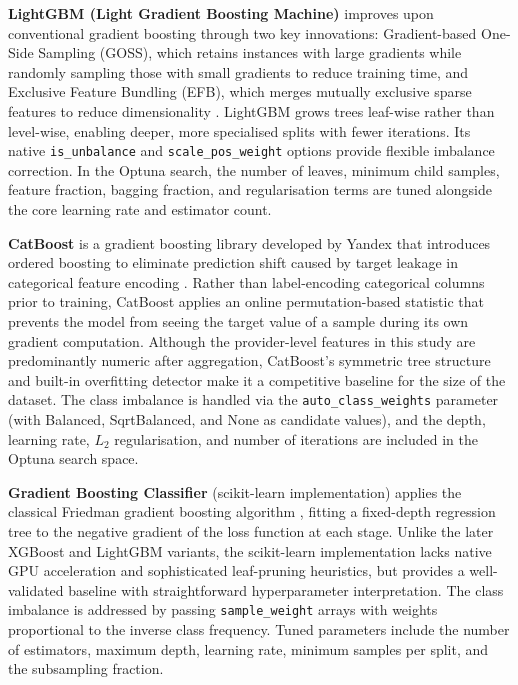 \begin{enumerate}[label=\roman*.]
\textbf{LightGBM (Light Gradient Boosting Machine)} improves upon conventional
gradient boosting through two key innovations: Gradient-based One-Side Sampling
(GOSS), which retains instances with large gradients while randomly sampling
those with small gradients to reduce training time, and Exclusive Feature Bundling
(EFB), which merges mutually exclusive sparse features to reduce
dimensionality \cite{ke2017}. LightGBM grows trees leaf-wise rather than
level-wise, enabling deeper, more specialised splits with fewer iterations.
Its native \texttt{is\_unbalance} and \texttt{scale\_pos\_weight} options provide
flexible imbalance correction. In the Optuna search, the number of leaves, minimum
child samples, feature fraction, bagging fraction, and regularisation terms are
tuned alongside the core learning rate and estimator count.

\textbf{CatBoost} is a gradient boosting library developed by Yandex that
introduces ordered boosting to eliminate prediction shift caused by target
leakage in categorical feature encoding \cite{prokhorenkova2018}. Rather than
label-encoding categorical columns prior to training, CatBoost applies an
online permutation-based statistic that prevents the model from seeing the
target value of a sample during its own gradient computation. Although the
provider-level features in this study are predominantly numeric after aggregation,
CatBoost's symmetric tree structure and built-in overfitting detector make it a
competitive baseline for the size of the dataset. The class imbalance is handled
via the \texttt{auto\_class\_weights} parameter (with Balanced, SqrtBalanced, and
None as candidate values), and the depth, learning rate, $L_2$ regularisation, and
number of iterations are included in the Optuna search space.

\textbf{Gradient Boosting Classifier} (scikit-learn implementation) applies the
classical Friedman gradient boosting algorithm \cite{friedman2001}, fitting a
fixed-depth regression tree to the negative gradient of the loss function at each
stage. Unlike the later XGBoost and LightGBM variants, the scikit-learn
implementation lacks native GPU acceleration and sophisticated leaf-pruning
heuristics, but provides a well-validated baseline with straightforward
hyperparameter interpretation. The class imbalance is addressed by passing
\texttt{sample\_weight} arrays with weights proportional to the inverse class
frequency. Tuned parameters include the number of estimators, maximum depth,
learning rate, minimum samples per split, and the subsampling fraction.


\end{enumerate}
